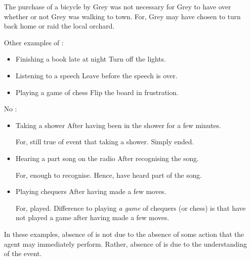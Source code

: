 \begin{note}
  The purchase of a bicycle by Grey was not necessary for Grey to have \ninf{} over whether or not Grey was walking to town.
  For, Grey may have chosen to turn back home or raid the local orchard.

  Other examples of :

  \begin{itemize}[noitemsep]
  \item
    Finishing a book late at night \hfill Turn off the lights.
  \item
    Listening to a speech \hfill Leave before the speech is over.
  \item
    Playing a game of chess \hfill Flip the board in frustration.
  \end{itemize}

  No \ninf{}:

  \begin{itemize}
  \item
    Taking a shower \hfill After having been in the shower for a few minutes.

    For, still true of event that taking a shower.
    Simply ended.
  \item
    Hearing a part song on the radio \hfill After recognising the song.

    For, enough to recognise.
    Hence, have heard part of the song.
  \item
    Playing chequers \hfill After having made a few moves.

    For, played.
    Difference to playing \emph{a game} of chequers (or chess) is that have not played a game after having made a few moves.
  \end{itemize}

  In these examples, absence of \ninf{} is not due to the absence of some action that the agent may immediately perform.
  Rather, absence of \ninf{} is due to the understanding of the event.
\end{note}


